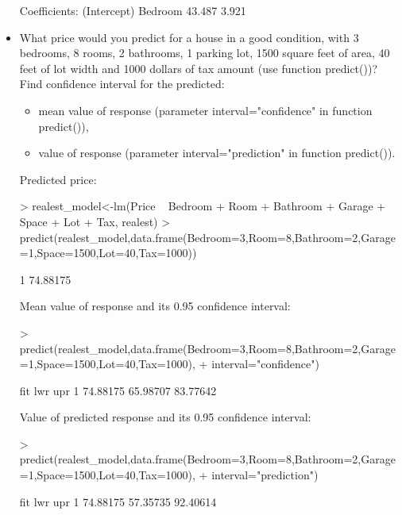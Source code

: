 \documentclass[a4paper]{article}
\begin{document}
\begin{itemize}
\begin{Schunk}
\begin{Soutput}
Coefficients:
(Intercept)      Bedroom  
     43.487        3.921  
\end{Soutput}
\end{Schunk}
\item What price would you predict for a house in a good condition, with 3 bedrooms, 8 rooms, 2 bathrooms, 1 parking lot, 1500 square feet of area, 40 feet of lot width and 1000 dollars of tax amount (use function predict())? Find confidence interval for the predicted: 
\begin{itemize}
\item mean value of response (parameter interval="confidence" in function predict()),
\item value of response (parameter interval="prediction" in function predict()).
\end{itemize}
Predicted price:
\begin{Schunk}
\begin{Sinput}
> realest_model<-lm(Price ~ Bedroom + Room + Bathroom + Garage + Space + Lot + Tax, realest)
> predict(realest_model,data.frame(Bedroom=3,Room=8,Bathroom=2,Garage=1,Space=1500,Lot=40,Tax=1000))
\end{Sinput}
\begin{Soutput}
       1 
74.88175 
\end{Soutput}
\end{Schunk}
Mean value of response and its 0.95 confidence interval:
\begin{Schunk}
\begin{Sinput}
> predict(realest_model,data.frame(Bedroom=3,Room=8,Bathroom=2,Garage=1,Space=1500,Lot=40,Tax=1000),
+         interval="confidence")
\end{Sinput}
\begin{Soutput}
       fit      lwr      upr
1 74.88175 65.98707 83.77642
\end{Soutput}
\end{Schunk}
Value of predicted response and its 0.95 confidence interval:
\begin{Schunk}
\begin{Sinput}
> predict(realest_model,data.frame(Bedroom=3,Room=8,Bathroom=2,Garage=1,Space=1500,Lot=40,Tax=1000),
+         interval="prediction")
\end{Sinput}
\begin{Soutput}
       fit      lwr      upr
1 74.88175 57.35735 92.40614
\end{Soutput}
\end{Schunk}
\end{itemize}
\end{document}
